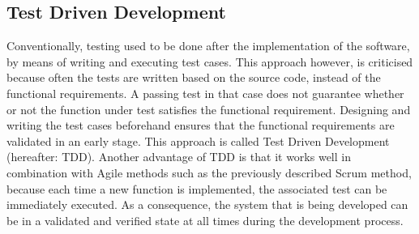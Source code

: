 \subsection{Test Driven Development}
Conventionally, testing used to be done after the implementation of the software, by means of writing and executing test cases. This approach however, is criticised because often the tests are written based on the source code, instead of the functional requirements. A passing test in that case does not guarantee whether or not the function under test satisfies the functional requirement. Designing and writing the test cases beforehand ensures that the functional requirements are validated in an early stage. This approach is called Test Driven Development (hereafter: TDD). Another advantage of TDD is that it works well in combination with Agile methods such as the previously described Scrum method, because each time a new function is implemented, the associated test can be immediately executed. As a consequence, the system that is being developed can be in a validated and verified state at all times during the development process.

